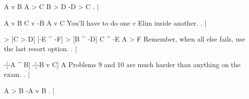 \argument
 A v B
 A > C
 B > D
\argumentline
 -D > C
\endargument
        \answer
        . | 
        \endfitchproof
        \endanswer

\argument
 A v B
 C v -B
\argumentline
 A v C
\endargument
\Hint You'll have to do one $v$ Elim inside another.
        \answer
        . | 
        \endfitchproof
        \endanswer

\resetfitchsetup
{}
\argument
 [A ^ B] > [C > D]
 [-E ^ -F] > [B ^ -D]
 C ^ -E
\argumentline
 A > F
\endargument
\Hint Remember, when all else fails, use the last resort option.
        \answer
        . | 
        \endfitchproof
        \endanswer

\argument
 -[-A ^ B]
 -[-B v C]
\argumentline
 A
\endargument
\Hint Problems 9 and 10 are much harder than anything on the exam.
        \answer
        . | 
        \endfitchproof
        \endanswer

\argument
 A > B
\argumentline
 -A v B
\endargument
        \answer
        . | 
        \endfitchproof
        \endanswer

\endproblems
\bye
